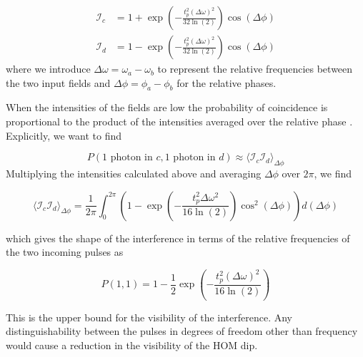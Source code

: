\begin{align}
	\mathcal{I}_c &= 1 + \exp\left(-\frac{t_p^2(\Delta\omega)^2}{32\ln(2)}\right)\cos(\Delta\phi)\\
	\mathcal{I}_d &= 1 - \exp\left(-\frac{t_p^2(\Delta\omega)^2}{32\ln(2)}\right)\cos(\Delta\phi)
\end{align}
where we introduce $\Delta\omega = \omega_a - \omega_b$ to represent the relative frequencies between the two input fields and $\Delta\phi = \phi_a - \phi_b$ for the relative phases. 

When the intensities of the fields are low the probability of coincidence is proportional to the product of the intensities averaged over the relative phase \cite{Rarity2005}. Explicitly, we want to find

\begin{equation}
	P(\text{1 photon in } c,\text{1 photon in } d) \approx \langle \mathcal{I}_c \mathcal{I}_d\rangle_{\Delta\phi}
\end{equation}
Multiplying the intensities calculated above and averaging $\Delta\phi$ over $2\pi$, we find
\begin{parahigh}
\begin{equation}
	\langle \mathcal{I}_c \mathcal{I}_d\rangle_{\Delta\phi} = \frac{1}{2\pi}\int_0^{2\pi}\left( 1 - \exp\left(-\frac{t_p^2 \Delta\omega^2}{16\ln(2)}\right)\cos^2(\Delta\phi) \right)d(\Delta\phi)
\end{equation} 
\end{parahigh}
which gives the shape of the interference in terms of the relative frequencies of the two incoming pulses as

\begin{equation}
	P(1,1) = 1 - \frac{1}{2} \exp\left( -\frac{t_p^2(\Delta\omega)^2}{16\ln(2)} \right)
\end{equation}

This is the upper bound for the visibility of the interference. Any distinguishability between the pulses in degrees of freedom other than frequency would cause a reduction in the visibility of the \ac{HOM} dip. 


